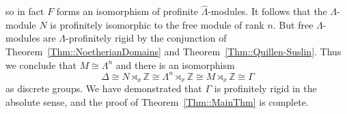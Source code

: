 \documentclass{amsart}
\newtheorem{theoremA}{Theorem}
\numberwithin{theorem}{section}
\numberwithin{equation}{section}
\newcommand{\Z}{\mathbb{Z}}
\begin{document}
so in fact $F$ forms an isomorphism of profinite $\widehat\Lambda$-modules. It follows that the $\Lambda$-module $N$ is profinitely isomorphic to the free module of rank $n$. But free $\Lambda$-modules are $\Lambda$-profinitely rigid by the conjunction of Theorem~\ref{Thm::NoetherianDomains} and Theorem~\ref{Thm::Quillen-Suslin}. Thus we conclude that $M \cong \Lambda^n$ and there is an isomorphism
\[
\Delta \cong N \rtimes_x \Z \cong \Lambda^n \rtimes_x \Z \cong M \rtimes_x \Z \cong \Gamma
\]
as discrete groups. We have demonstrated that $\Gamma$ is profinitely rigid in the absolute sense, and the proof of Theorem~\ref{Thm::MainThm} is complete.

\printbibliography
\end{document}
